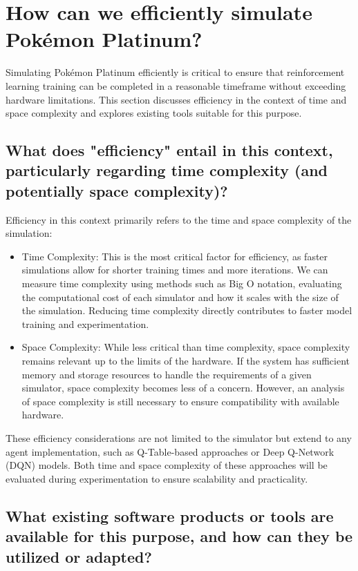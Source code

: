 \section{How can we efficiently simulate Pokémon Platinum?}

Simulating Pokémon Platinum efficiently is critical to ensure that reinforcement learning training can be completed in a reasonable timeframe without exceeding hardware limitations. This section discusses efficiency in the context of time and space complexity and explores existing tools suitable for this purpose.

\subsection{What does "efficiency" entail in this context, particularly regarding time complexity (and potentially space complexity)?}

Efficiency in this context primarily refers to the time and space complexity of the simulation:
\begin{itemize}
    \item Time Complexity: This is the most critical factor for efficiency, as faster simulations allow for shorter training times and more iterations. We can measure time complexity using methods such as Big O notation, evaluating the computational cost of each simulator and how it scales with the size of the simulation. Reducing time complexity directly contributes to faster model training and experimentation.
    \item Space Complexity: While less critical than time complexity, space complexity remains relevant up to the limits of the hardware. If the system has sufficient memory and storage resources to handle the requirements of a given simulator, space complexity becomes less of a concern. However, an analysis of space complexity is still necessary to ensure compatibility with available hardware.
\end{itemize}

These efficiency considerations are not limited to the simulator but extend to any agent implementation, such as Q-Table-based approaches or Deep Q-Network (DQN) models. Both time and space complexity of these approaches will be evaluated during experimentation to ensure scalability and practicality.

\subsection{What existing software products or tools are available for this purpose, and how can they be utilized or adapted?}

